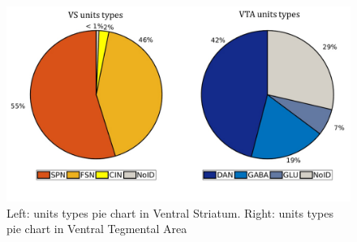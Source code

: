 \begin{figure}
  \centering
    \includegraphics[scale=0.5]{figures/PieRegions1.pdf}
   \caption{Left: units types pie chart in Ventral Striatum. Right: units types pie chart in Ventral Tegmental Area}
    \label{fig:PieRegions}
\end{figure}

